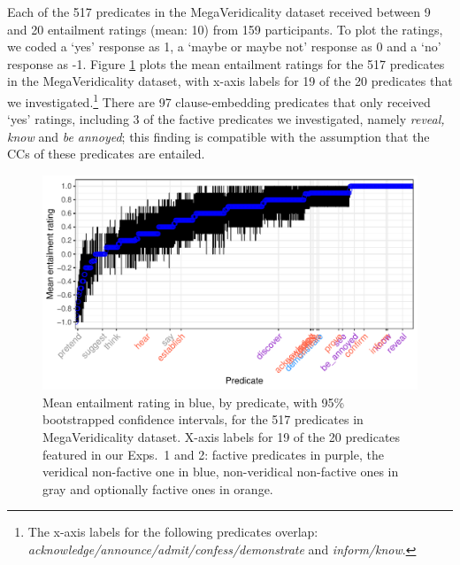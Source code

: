 \documentclass[11pt,fleqn]{article}
\newcommand{\6}{\mbox{$[\hspace*{-.6mm}[$}}
\newcommand{\9}{\mbox{$]\hspace*{-.6mm}]$}}
\begin{document}
{Each of the 517 predicates in the MegaVeridicality dataset received between 9 and 20 entailment ratings (mean: 10) from 159 participants. To plot the ratings, we coded a `yes' response as 1, a `maybe or maybe not' response as 0 and a `no' response as -1. Figure \ref{f-white-rawlins-ent} plots the mean entailment ratings for the 517 predicates in the MegaVeridicality dataset, with x-axis labels for 19 of the 20 predicates that we investigated.\footnote{The x-axis labels for the following predicates overlap: {\em acknowledge/announce/admit/confess/demonstrate} and {\em inform/know}.} There are 97 clause-embedding predicates that only received `yes' ratings, including 3 of the factive predicates we investigated, namely {\em reveal, know} and {\em be annoyed}; this finding is compatible with the assumption that the CCs of these predicates are entailed. 

\begin{figure}[H]
\centering
\includegraphics[width=.75\paperwidth]{../../white-rawlins-data/graphs/means-entailment-by-predicate}

\caption{Mean entailment rating in blue, by predicate, with 95\% bootstrapped confidence intervals, for the 517 predicates in MegaVeridicality dataset. X-axis labels for 19 of the 20 predicates featured in our Exps.~1 and 2: factive predicates in purple, the veridical non-factive one in blue, non-veridical non-factive ones in gray and optionally factive ones in orange.}
\label{f-white-rawlins-ent}
\end{figure}

}
\end{document}
